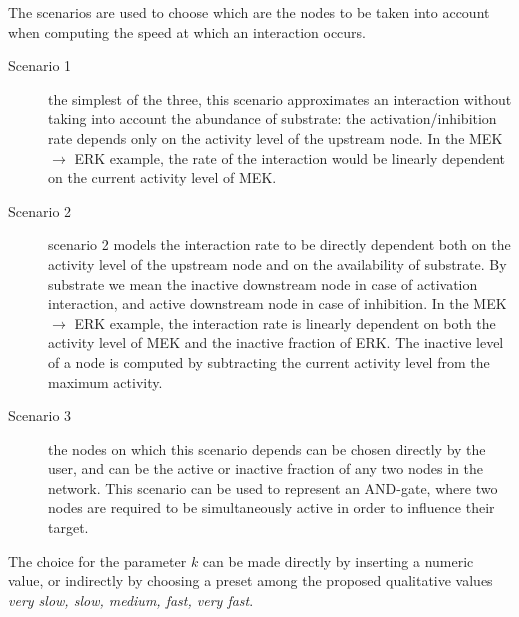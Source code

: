 \documentclass[submission,copyright,creativecommons]{eptcs}
\begin{document}
The scenarios are used to choose which are the nodes to be taken into account
when computing the speed at which an interaction occurs.
\begin{description}
  \item[Scenario 1] the simplest of the three, this scenario approximates an interaction
    without taking into account the abundance of substrate: the activation/inhibition rate
    depends only on the activity level of the upstream node. In the MEK $\rightarrow$ ERK
    example, the rate of the interaction would be linearly dependent on the current activity level of MEK.
  \item[Scenario 2] scenario 2 models the interaction rate
    to be directly dependent both on the activity
    level of the upstream node and on the availability of substrate. By substrate we
    mean the inactive downstream node in case of activation interaction, and active downstream node in case of inhibition.
    In the MEK $\rightarrow$ ERK example, the interaction rate is linearly dependent on
    both the activity level of MEK and the inactive fraction of ERK.
    The inactive level of a node is computed by subtracting the current activity level from the maximum activity.
  \item[Scenario 3] the nodes on which this scenario depends can be chosen directly by the user,
    and can be the active or inactive fraction of any two nodes in the network.
    This scenario can be used to represent an AND-gate, where two nodes are required to
    be simultaneously active in order to influence their target.
\end{description}

The choice for the parameter $k$ can be made directly by inserting a numeric value, or 
indirectly by choosing a preset among the proposed qualitative values \emph{very slow, slow, medium, fast, very fast}.
\end{document}
